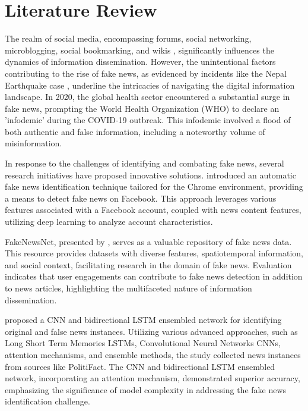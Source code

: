 \chapter{Literature Review}
\label{ch:lit_rev} %

The realm of social media, encompassing forums, social networking, microblogging, social 
bookmarking, and wikis \citep{esrc,gil2019}, significantly influences the dynamics of 
information dissemination. However, the unintentional factors contributing to the rise of fake 
news, as evidenced by incidents like the Nepal Earthquake case 
\citep{tandoc2017,radianti2016}, underline the intricacies of navigating the digital 
information landscape. In 2020, the global health sector encountered a substantial surge in 
fake news, prompting the World Health Organization (WHO) to declare an 'infodemic' during the 
COVID-19 outbreak. This infodemic involved a flood of both authentic and false information, 
including a noteworthy volume of misinformation.

In response to the challenges of identifying and combating fake news, several research 
initiatives have proposed innovative solutions. \cite{sahoo2021multiple} introduced an 
automatic fake news identification technique tailored for the Chrome environment, providing a 
means to detect fake news on Facebook. This approach leverages various features associated with 
a Facebook account, coupled with news content features, utilizing deep learning to analyze 
account characteristics.

FakeNewsNet, presented by \cite{shu2020fakenewsnet}, serves as a valuable repository of fake 
news data. This resource provides datasets with diverse features, spatiotemporal information, 
and social context, facilitating research in the domain of fake news. Evaluation indicates that 
user engagements can contribute to fake news detection in addition to news articles, 
highlighting the multifaceted nature of information dissemination.

\cite{Kumar} proposed a CNN and bidirectional LSTM ensembled network for identifying original 
and false news instances. Utilizing various advanced approaches, such as Long Short Term 
Memories LSTMs, Convolutional Neural Networks CNNs, attention mechanisms, and ensemble methods, 
the study collected news instances from sources like PolitiFact. The CNN and bidirectional LSTM 
ensembled network, incorporating an attention mechanism, demonstrated superior accuracy, 
emphasizing the significance of model complexity in addressing the fake news identification 
challenge.

